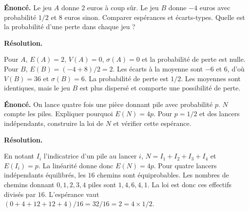 \documentclass[11pt,a4paper]{article}
\begin{document}
\par\noindent\begin{minipage}{\linewidth}
{\small\color{Muted}\textbf{Énoncé.} Le jeu $A$ donne $2$ euros à coup sûr. Le jeu $B$ donne $-4$ euros avec probabilité $1/2$ et $8$ euros sinon. Comparer espérances et écarts-types. Quelle est la probabilité d’une perte dans chaque jeu ?}
\par\medskip
\textbf{Résolution.}\par
Pour $A$, $E(A)=2$, $V(A)=0$, $\sigma(A)=0$ et la probabilité de perte est nulle. Pour $B$, $E(B)=(-4+8)/2=2$. Les écarts à la moyenne sont $-6$ et $6$, d’où $V(B)=36$ et $\sigma(B)=6$. La probabilité de perte est $1/2$. Les moyennes sont identiques, mais le jeu $B$ est plus dispersé et comporte une possibilité de perte.
\end{minipage}\par
\par\noindent\begin{minipage}{\linewidth}
{\small\color{Muted}\textbf{Énoncé.} On lance quatre fois une pièce donnant pile avec probabilité $p$. $N$ compte les piles. Expliquer pourquoi $E(N)=4p$. Pour $p=1/2$ et des lancers indépendants, construire la loi de $N$ et vérifier cette espérance.}
\par\medskip
\textbf{Résolution.}\par
En notant $I_i$ l’indicatrice d’un pile au lancer $i$, $N=I_1+I_2+I_3+I_4$ et $E(I_i)=p$. La linéarité donne donc $E(N)=4p$. Pour quatre lancers indépendants équilibrés, les $16$ chemins sont équiprobables. Les nombres de chemins donnant $0,1,2,3,4$ piles sont $1,4,6,4,1$. La loi est donc ces effectifs divisés par $16$. L’espérance vaut $(0+4+12+12+4)/16=32/16=2=4\times1/2$.
\end{minipage}\par
\end{document}
